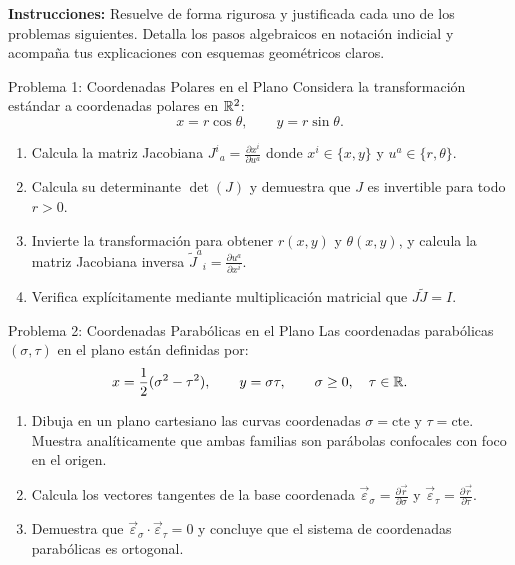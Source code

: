 \documentclass[11pt,letterpaper]{article}
\begin{document}
\setlength{\abovedisplayskip}{6pt}
\setlength{\belowdisplayskip}{6pt}
\setlength{\textfloatsep}{10pt}
\setlength{\intextsep}{8pt}
\color{blackmain}


\noindent\textbf{Instrucciones:} Resuelve de forma rigurosa y justificada cada uno de los problemas siguientes. Detalla los pasos algebraicos en notación indicial y acompaña tus explicaciones con esquemas geométricos claros.


\begin{infobox}{Problema 1: Coordenadas Polares en el Plano}
Considera la transformación estándar a coordenadas polares en $\mathbb{R}^2$:
\[
x = r\cos\theta, \qquad y = r\sin\theta.
\]
\begin{enumerate}[label=(\alph*)]
    \item Calcula la matriz Jacobiana $J^i{}_a = \frac{\partial x^i}{\partial u^a}$ donde $x^i \in \{x, y\}$ y $u^a \in \{r, \theta\}$.
    \item Calcula su determinante $\det(J)$ y demuestra que $J$ es invertible para todo $r > 0$.
    \item Invierte la transformación para obtener $r(x, y)$ y $\theta(x, y)$, y calcula la matriz Jacobiana inversa $\tilde{J}^a{}_i = \frac{\partial u^a}{\partial x^i}$.
    \item Verifica explícitamente mediante multiplicación matricial que $J \tilde{J} = I$.
\end{enumerate}
\end{infobox}

\begin{infobox}{Problema 2: Coordenadas Parabólicas en el Plano}
Las coordenadas parabólicas $(\sigma, \tau)$ en el plano están definidas por:
\[
x = \frac{1}{2}(\sigma^2 - \tau^2), \qquad y = \sigma\tau, \qquad \sigma \ge 0, \quad \tau \in \mathbb{R}.
\]
\begin{enumerate}[label=(\alph*)]
    \item Dibuja en un plano cartesiano las curvas coordenadas $\sigma = \text{cte}$ y $\tau = \text{cte}$. Muestra analíticamente que ambas familias son parábolas confocales con foco en el origen.
    \item Calcula los vectores tangentes de la base coordenada $\vec{\varepsilon}_\sigma = \frac{\partial\vec{r}}{\partial\sigma}$ y $\vec{\varepsilon}_\tau = \frac{\partial\vec{r}}{\partial\tau}$.
    \item Demuestra que $\vec{\varepsilon}_\sigma \cdot \vec{\varepsilon}_\tau = 0$ y concluye que el sistema de coordenadas parabólicas es ortogonal.
\end{enumerate}
\end{infobox}
\end{document}
